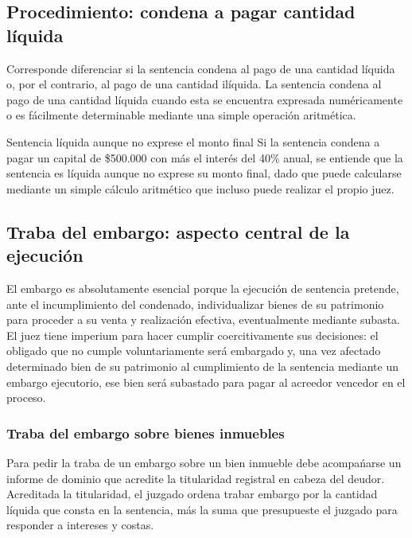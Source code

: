 \documentclass[12pt,oneside]{book}
\begin{document}
\subsection{Procedimiento: condena a pagar cantidad l\'iquida}

Corresponde diferenciar si la sentencia condena al pago de una cantidad l\'iquida o, por el contrario, al pago de una cantidad il\'iquida. La sentencia condena al pago de una cantidad l\'iquida cuando esta se encuentra expresada num\'ericamente o es f\'acilmente determinable mediante una simple operaci\'on aritm\'etica.

\begin{example}{Sentencia l\'iquida aunque no exprese el monto final}
Si la sentencia condena a pagar un capital de \$500.000 con m\'as el inter\'es del 40\% anual, se entiende que la sentencia es l\'iquida aunque no exprese su monto final, dado que puede calcularse mediante un simple c\'alculo aritm\'etico que incluso puede realizar el propio juez.
\end{example}

\subsection{Traba del embargo: aspecto central de la ejecuci\'on}

\begin{important}
El embargo es absolutamente esencial porque la ejecuci\'on de sentencia pretende, ante el incumplimiento del condenado, individualizar bienes de su patrimonio para proceder a su venta y realizaci\'on efectiva, eventualmente mediante subasta. El juez tiene imperium para hacer cumplir coercitivamente sus decisiones: el obligado que no cumple voluntariamente ser\'a embargado y, una vez afectado determinado bien de su patrimonio al cumplimiento de la sentencia mediante un embargo ejecutorio, ese bien ser\'a subastado para pagar al acreedor vencedor en el proceso.
\end{important}

\subsubsection{Traba del embargo sobre bienes inmuebles}

Para pedir la traba de un embargo sobre un bien inmueble debe acompa\'narse un informe de dominio que acredite la titularidad registral en cabeza del deudor. Acreditada la titularidad, el juzgado ordena trabar embargo por la cantidad l\'iquida que consta en la sentencia, m\'as la suma que presupueste el juzgado para responder a intereses y costas.
\end{document}
